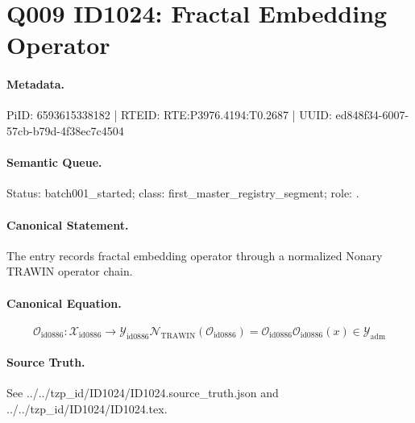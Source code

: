 \section*{Q009 ID1024: Fractal Embedding Operator}
\paragraph{Metadata.}
PiID: 6593615338182 | RTEID: RTE:P3976.4194:T0.2687 | UUID: ed848f34-6007-57cb-b79d-4f38ec7c4504

\paragraph{Semantic Queue.}
Status: batch001\_started; class: first\_master\_registry\_segment; role: .

\paragraph{Canonical Statement.}
The entry records fractal embedding operator through a normalized Nonary TRAWIN operator chain.

\paragraph{Canonical Equation.}
\[
\mathcal{O}_{\mathrm{id0886}}:\mathcal{X}_{\mathrm{id0886}}\longrightarrow\mathcal{Y}_{\mathrm{id0886}} \mathcal{N}_{\mathrm{TRAWIN}}(\mathcal{O}_{\mathrm{id0886}})=\mathcal{O}_{\mathrm{id0886}} \mathcal{O}_{\mathrm{id0886}}(x)\in\mathcal{Y}_{\mathrm{adm}}
\]

\paragraph{Source Truth.}
See ../../tzp\_id/ID1024/ID1024.source\_truth.json and ../../tzp\_id/ID1024/ID1024.tex.
